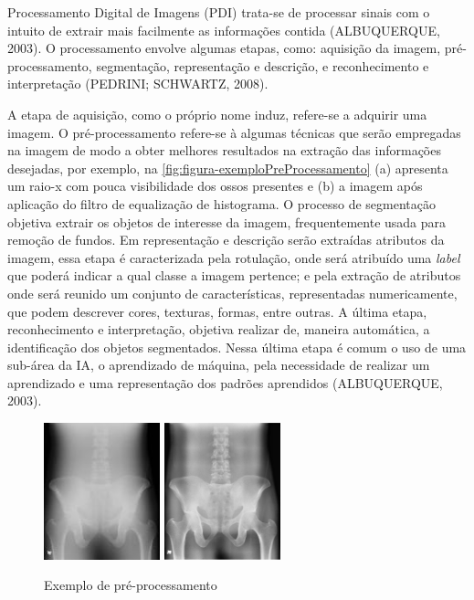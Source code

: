 Processamento Digital de Imagens (PDI) trata-se de processar sinais com o intuito de extrair mais facilmente as informações contida (ALBUQUERQUE, 2003). O processamento envolve algumas etapas, como: aquisição da imagem, pré-processamento, segmentação, representação e descrição, e reconhecimento e interpretação (PEDRINI; SCHWARTZ, 2008).

A etapa de aquisição, como o próprio nome induz, refere-se a adquirir uma imagem. O pré-processamento refere-se à algumas técnicas que serão empregadas na imagem de modo a obter melhores resultados na extração das informações desejadas, por exemplo, na \autoref{fig:figura-exemploPreProcessamento} (a) apresenta um raio-x com pouca visibilidade dos ossos presentes  e (b) a imagem após aplicação do filtro de equalização de histograma. O processo de segmentação objetiva extrair os objetos de interesse da imagem, frequentemente usada para remoção de fundos. Em representação e descrição serão extraídas atributos da imagem, essa etapa é caracterizada pela rotulação, onde será atribuído uma \textit{label} que poderá indicar a qual classe a imagem pertence; e pela extração de atributos onde será reunido um conjunto de características, representadas numericamente, que podem descrever cores, texturas, formas, entre outras.  A última etapa, reconhecimento e interpretação, objetiva realizar de, maneira automática, a identificação dos objetos segmentados. Nessa última etapa é comum o uso de uma sub-área da IA, o aprendizado de máquina, pela necessidade de realizar um aprendizado e uma representação dos padrões aprendidos (ALBUQUERQUE, 2003).


\begin{figure}[!htb]
    \centering
    \caption{Exemplo de pré-processamento}
    \includegraphics[width=0.3\textwidth]{./dados/figuras/figura1-a.jpg}
    \includegraphics[width=0.3\textwidth]{./dados/figuras/figura1-b.jpeg}
    \label{fig:figura-exemploPreProcessamento}
\end{figure}


